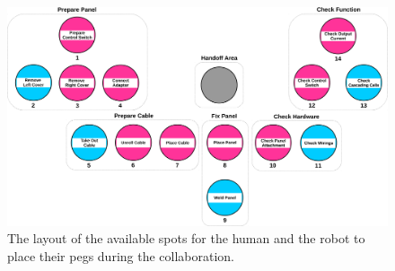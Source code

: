 \documentclass[12pt]{report}
\begin{document}
\begin{figure}[tbh]
  \centering
  \includegraphics[width=1\textwidth]{figure/gameBoard.pdf}
  \caption{The layout of the available spots for the human and the robot to
  place their pegs during the collaboration.}
  \label{fig:game_board}
\end{figure}
\end{document}

